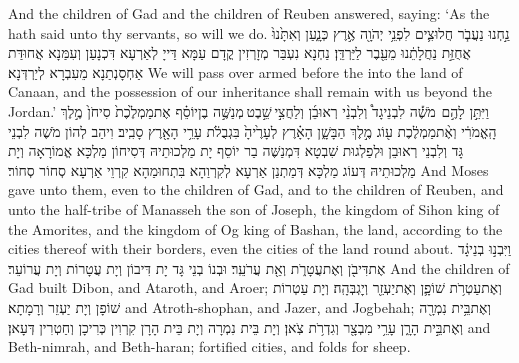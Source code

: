 {And the children of Gad and the children of Reuben answered, saying: ‘As the \lord\space hath said unto thy servants, so will we do.}{}
{נַ֣חְנוּ נַעֲבֹ֧ר חֲלוּצִ֛ים לִפְנֵ֥י יְהֹוָ֖ה אֶ֣רֶץ כְּנָ֑עַן וְאִתָּ֙נוּ֙ אֲחֻזַּ֣ת נַחֲלָתֵ֔נוּ מֵעֵ֖בֶר לַיַּרְדֵּֽן׃}
{נַחְנָא נִעְבַּר מְזָרְזִין קֳדָם עַמָּא דַּייָ לְאַרְעָא דִּכְנָעַן וְעִמַּנָא אֲחוּדַּת אַחְסָנְתַנָא מֵעִבְרָא לְיַרְדְּנָא׃}
{We will pass over armed before the \lord\space into the land of Canaan, and the possession of our inheritance shall remain with us beyond the Jordan.’}{}
{וַיִּתֵּ֣ן לָהֶ֣ם \pasek  מֹשֶׁ֡ה לִבְנֵי\maqqaf גָד֩ וְלִבְנֵ֨י רְאוּבֵ֜ן וְלַחֲצִ֣י \legarmeh  שֵׁ֣בֶט \legarmeh  מְנַשֶּׁ֣ה בֶן\maqqaf יוֹסֵ֗ף אֶת\maqqaf מַמְלֶ֙כֶת֙ סִיחֹן֙ מֶ֣לֶךְ הָֽאֱמֹרִ֔י וְאֶ֨ת\maqqaf מַמְלֶ֔כֶת ע֖וֹג מֶ֣לֶךְ הַבָּשָׁ֑ן הָאָ֗רֶץ לְעָרֶ֙יהָ֙ בִּגְבֻלֹ֔ת עָרֵ֥י הָאָ֖רֶץ סָבִֽיב׃}
{וִיהַב לְהוֹן מֹשֶׁה לִבְנֵי גָּד וְלִבְנֵי רְאוּבֵן וּלְפַלְגוּת שִׁבְטָא דִּמְנַשֶּׁה בַר יוֹסֵף יָת מַלְכוּתֵיהּ דְּסִיחוֹן מַלְכָּא אֱמוֹרָאָה וְיָת מַלְכוּתֵיהּ דְּעוֹג מַלְכָּא דְּמַתְנַן אַרְעָא לְקִרְוַהָא בִּתְחוּמַהָא קִרְוֵי אַרְעָא סְחוֹר סְחוֹר׃}
{And Moses gave unto them, even to the children of Gad, and to the children of Reuben, and unto the half-tribe of Manasseh the son of Joseph, the kingdom of Sihon king of the Amorites, and the kingdom of Og king of Bashan, the land, according to the cities thereof with their borders, even the cities of the land round about.}{}
{וַיִּבְנ֣וּ בְנֵי\maqqaf גָ֔ד אֶת\maqqaf דִּיבֹ֖ן וְאֶת\maqqaf עֲטָרֹ֑ת וְאֵ֖ת עֲרֹעֵֽר׃}
{וּבְנוֹ בְנֵי גָּד יָת דִּיבוֹן וְיָת עֲטָרוֹת וְיָת עֲרוֹעֵר׃}
{And the children of Gad built Dibon, and Ataroth, and Aroer;}{}
{וְאֶת\maqqaf עַטְרֹ֥ת שׁוֹפָ֛ן וְאֶת\maqqaf יַעְזֵ֖ר וְיׇגְבְּהָֽה׃}
{וְיָת עַטְרוֹת שׁוֹפָן וְיָת יַעְזֵר וְרָמָתָא׃}
{and Atroth-shophan, and Jazer, and Jogbehah;}{}
{וְאֶת\maqqaf בֵּ֥ית נִמְרָ֖ה וְאֶת\maqqaf בֵּ֣ית הָרָ֑ן עָרֵ֥י מִבְצָ֖ר וְגִדְרֹ֥ת צֹֽאן׃}
{וְיָת בֵּית נִמְרָה וְיָת בֵּית הָרָן קִרְוִין כְּרִיכָן וְחַטְרִין דְּעָאן׃}
{and Beth-nimrah, and Beth-haran; fortified cities, and folds for sheep.}{}
